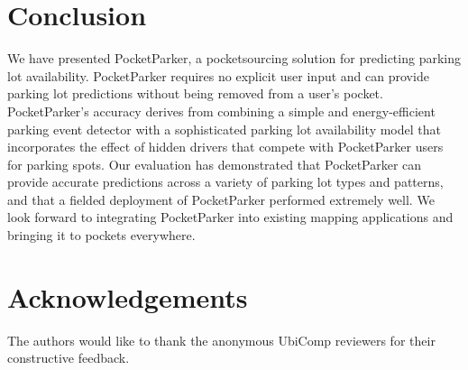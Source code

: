 \vspace*{-0.05in}
\section{Conclusion}

We have presented PocketParker, a pocketsourcing solution for predicting
parking lot availability. PocketParker requires no explicit user input and
can provide parking lot predictions without being removed from a user's
pocket. PocketParker's accuracy derives from combining a simple and
energy-efficient parking event detector with a sophisticated parking lot
availability model that incorporates the effect of hidden drivers that
compete with PocketParker users for parking spots. Our evaluation has
demonstrated that PocketParker can provide accurate predictions across a
variety of parking lot types and patterns, and that a fielded deployment of
PocketParker performed extremely well. We look forward to integrating
PocketParker into existing mapping applications and bringing it to pockets
everywhere.

\vspace*{-0.05in}
\section*{Acknowledgements}

The authors would like to thank the anonymous UbiComp reviewers for their
constructive feedback.
